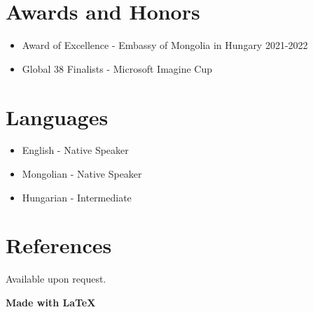 \documentclass[11pt,a4paper]{article}
\begin{document}
\section*{Awards and Honors}

\begin{itemize}
    \item Award of Excellence - Embassy of Mongolia in Hungary 2021-2022
    \item Global 38 Finalists - Microsoft Imagine Cup
\end{itemize}

\section*{Languages}

\begin{itemize}
    \item English - Native Speaker
    \item Mongolian - Native Speaker
    \item Hungarian - Intermediate
\end{itemize}

\section*{References}

Available upon request.



\begin{center}
  \textbf{Made with \LaTeX}
\end{center}
\end{document}
